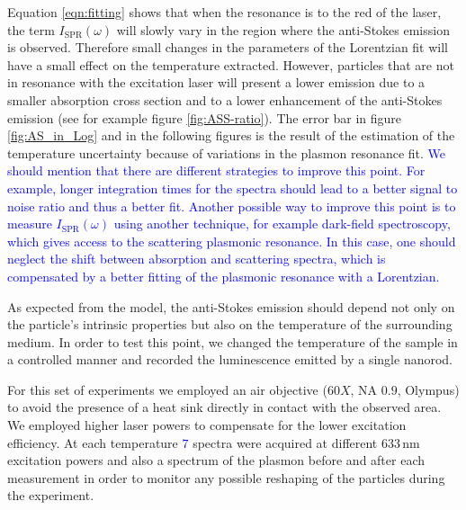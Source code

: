 \documentclass[journal=nalefd,manuscript=letter]{achemso}
\newcommand{\HI}[1]{\textcolor{blue}{#1}} %
\newcommand{\nm}{\ensuremath{\,\textrm{nm}}}
\begin{document}
Equation \ref{eqn:fitting} shows that when the resonance is to the red
of the laser, the term $I_\textrm{SPR}(\omega)$ will slowly vary in the region where the
anti-Stokes emission is observed. Therefore small changes in the parameters of
the Lorentzian fit will have a small effect on the temperature extracted.
However, particles that are not in resonance with the excitation laser will
present a lower emission due to a smaller absorption cross section and to a
lower enhancement of the anti-Stokes emission (see for example figure
\ref{fig:ASS-ratio}). 
The error bar in figure
\ref{fig:AS_in_Log} and in the following figures is the result of the estimation
of the temperature uncertainty because of variations in the plasmon resonance
fit. \HI{We should mention that there are different strategies to improve this point.
For example, longer integration times for the spectra should lead 
to a better signal to noise ratio and thus a better fit.
Another possible way to improve this point is to measure $I_\textrm{SPR}(\omega)$ 
using another technique, for example dark-field spectroscopy, which gives access to
the scattering plasmonic resonance. In this case, one should neglect the shift 
between absorption and scattering spectra, which is compensated by a better fitting of the plasmonic resonance with a Lorentzian.}

As expected from the model, the anti-Stokes emission should depend not only on
the particle's intrinsic properties but also on the temperature of the
surrounding medium\cite{Konrad2013}. In order to test this point, we changed the
temperature of the sample in a controlled manner and recorded the luminescence
emitted by a single nanorod.

For this set of experiments we employed an air objective ($60X$, NA $0.9$,
Olympus) to avoid the presence of a heat sink directly in contact with the
observed area. We employed higher laser powers to compensate for the lower
excitation efficiency. At each temperature \HI{$7$} spectra were acquired at different
$633\nm$ excitation powers and also a spectrum of the plasmon before and after
each measurement in order to monitor any possible reshaping of the particles
during the experiment.
\end{document}
